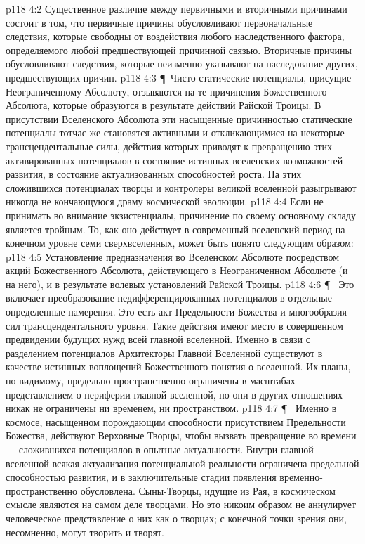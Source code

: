 \vs p118 4:2 Существенное различие между первичными и вторичными причинами состоит в том, что первичные причины обусловливают первоначальные следствия, которые свободны от воздействия любого наследственного фактора, определяемого любой предшествующей причинной связью. Вторичные причины обусловливают следствия, которые неизменно указывают на наследование других, предшествующих причин.
\vs p118 4:3 \P\ Чисто статические потенциалы, присущие Неограниченному Абсолюту, отзываются на те причинения Божественного Абсолюта, которые образуются в результате действий Райской Троицы. В присутствии Вселенского Абсолюта эти насыщенные причинностью статические потенциалы тотчас же становятся активными и откликающимися на некоторые трансцендентальные силы, действия которых приводят к превращению этих активированных потенциалов в состояние истинных вселенских возможностей развития, в состояние актуализованных способностей роста. На этих сложившихся потенциалах творцы и контролеры великой вселенной разыгрывают никогда не кончающуюся драму космической эволюции.
\vs p118 4:4 Если не принимать во внимание экзистенциалы, причинение по своему основному складу является тройным. То, как оно действует в современный вселенский период на конечном уровне семи сверхвселенных, может быть понято следующим образом:
\vs p118 4:5 \bibnobreakspace {} Установление предназначения во Вселенском Абсолюте посредством акций Божественного Абсолюта, действующего в Неограниченном Абсолюте (и на него), и в результате волевых установлений Райской Троицы.
\vs p118 4:6 \P\ \bibnobreakspace {} Это включает преобразование недифференцированных потенциалов в отдельные определенные намерения. Это есть акт Предельности Божества и многообразия сил трансцендентального уровня. Такие действия имеют место в совершенном предвидении будущих нужд всей главной вселенной. Именно в связи с разделением потенциалов Архитекторы Главной Вселенной существуют в качестве истинных воплощений Божественного понятия о вселенной. Их планы, по\hyp{}видимому, предельно пространственно ограничены в масштабах представлением о периферии главной вселенной, но  они в других отношениях никак не ограничены ни временем, ни пространством.
\vs p118 4:7 \P\ \bibnobreakspace {} Именно в космосе, насыщенном порождающим способности присутствием Предельности Божества, действуют Верховные Творцы, чтобы вызвать превращение во времени--- сложившихся потенциалов в опытные актуальности. Внутри главной вселенной всякая актуализация потенциальной реальности ограничена предельной способностью развития, и в заключительные стадии появления временно\hyp{}пространственно обусловлена. Сыны\hyp{}Творцы, идущие из Рая, в космическом смысле являются на самом деле  творцами. Но это никоим образом не аннулирует человеческое представление о них как о творцах; с конечной точки зрения они, несомненно, могут творить и творят.
